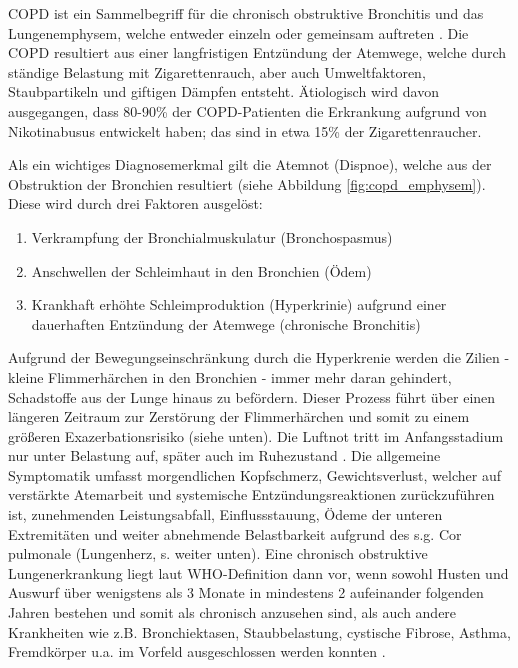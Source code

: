 COPD ist ein Sammelbegriff für die chronisch obstruktive Bronchitis und das Lungenemphysem, welche entweder einzeln oder gemeinsam auftreten \autocite[vgl.][153]{lorenz2009}. Die COPD resultiert aus einer langfristigen Entzündung der Atemwege, welche durch ständige Belastung mit Zigarettenrauch, aber auch Umweltfaktoren, Staubpartikeln und giftigen Dämpfen entsteht. Ätiologisch wird davon ausgegangen, dass 80-90\% der COPD-Patienten die Erkrankung aufgrund von Nikotinabusus entwickelt haben; das sind in etwa 15\% der Zigarettenraucher\autocite[vgl.][154]{lorenz2009}. 

Als ein wichtiges Diagnosemerkmal gilt die Atemnot (Dispnoe), welche aus der Obstruktion der Bronchien resultiert (siehe Abbildung \ref{fig:copd_emphysem}). Diese wird durch drei Faktoren ausgelöst: 

\begin{enumerate}
\item Verkrampfung der Bronchialmuskulatur (Bronchospasmus)
\item Anschwellen der Schleimhaut in den Bronchien (Ödem)
\item Krankhaft erhöhte Schleimproduktion (Hyperkrinie) aufgrund einer dauerhaften Entzündung der Atemwege (chronische Bronchitis)
\end{enumerate}

Aufgrund der Bewegungseinschränkung durch die Hyperkrenie werden die Zilien - kleine Flimmerhärchen in den Bronchien - immer mehr daran gehindert, Schadstoffe aus der Lunge hinaus zu befördern. Dieser Prozess führt über einen längeren Zeitraum zur Zerstörung der Flimmerhärchen und somit zu einem größeren Exazerbationsrisiko (siehe unten).
Die Luftnot tritt im Anfangsstadium nur unter Belastung auf, später auch im Ruhezustand \autocite[vgl.][6f.]{lorenz2009}. Die allgemeine Symptomatik umfasst morgendlichen Kopfschmerz, Gewichtsverlust, welcher auf verstärkte Atemarbeit und systemische Entzündungsreaktionen zurückzuführen ist, zunehmenden Leistungsabfall, Einflussstauung, Ödeme der unteren Extremitäten und weiter abnehmende Belastbarkeit aufgrund des s.g. Cor pulmonale (Lungenherz, s. weiter unten).
Eine chronisch obstruktive Lungenerkrankung liegt laut WHO-Definition dann vor, wenn sowohl Husten und Auswurf über wenigstens als 3 Monate in mindestens 2 aufeinander folgenden Jahren bestehen und somit als chronisch anzusehen sind, als auch andere Krankheiten wie z.B. Bronchiektasen, Staubbelastung, cystische Fibrose, Asthma, Fremdkörper u.a. im Vorfeld ausgeschlossen werden konnten \autocite[vgl.][71]{koehler2010}. 

